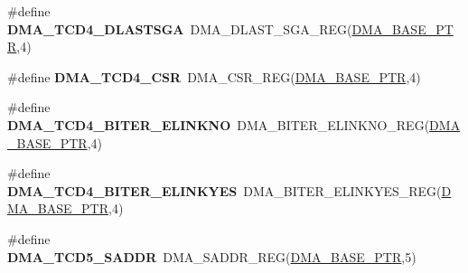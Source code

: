 \begin{DoxyCompactItemize}
\item 
\hypertarget{group___d_m_a___register___accessor___macros_ga087e361e7331f84abef82e41a3c6961f}{}\#define {\bfseries D\+M\+A\+\_\+\+T\+C\+D4\+\_\+\+D\+L\+A\+S\+T\+S\+G\+A}~D\+M\+A\+\_\+\+D\+L\+A\+S\+T\+\_\+\+S\+G\+A\+\_\+\+R\+E\+G(\hyperlink{group___d_m_a___peripheral_ga6997fbc1b1973e9f27170217a3bd6f22}{D\+M\+A\+\_\+\+B\+A\+S\+E\+\_\+\+P\+T\+R},4)\label{group___d_m_a___register___accessor___macros_ga087e361e7331f84abef82e41a3c6961f}

\item 
\hypertarget{group___d_m_a___register___accessor___macros_ga2a4c75adfdd4fccd9a457a92aab5ebb3}{}\#define {\bfseries D\+M\+A\+\_\+\+T\+C\+D4\+\_\+\+C\+S\+R}~D\+M\+A\+\_\+\+C\+S\+R\+\_\+\+R\+E\+G(\hyperlink{group___d_m_a___peripheral_ga6997fbc1b1973e9f27170217a3bd6f22}{D\+M\+A\+\_\+\+B\+A\+S\+E\+\_\+\+P\+T\+R},4)\label{group___d_m_a___register___accessor___macros_ga2a4c75adfdd4fccd9a457a92aab5ebb3}

\item 
\hypertarget{group___d_m_a___register___accessor___macros_ga026a693d34bf8ae3c371c5f4ce25e073}{}\#define {\bfseries D\+M\+A\+\_\+\+T\+C\+D4\+\_\+\+B\+I\+T\+E\+R\+\_\+\+E\+L\+I\+N\+K\+N\+O}~D\+M\+A\+\_\+\+B\+I\+T\+E\+R\+\_\+\+E\+L\+I\+N\+K\+N\+O\+\_\+\+R\+E\+G(\hyperlink{group___d_m_a___peripheral_ga6997fbc1b1973e9f27170217a3bd6f22}{D\+M\+A\+\_\+\+B\+A\+S\+E\+\_\+\+P\+T\+R},4)\label{group___d_m_a___register___accessor___macros_ga026a693d34bf8ae3c371c5f4ce25e073}

\item 
\hypertarget{group___d_m_a___register___accessor___macros_gac0e84c3dc53946dfd4bcd461b1620963}{}\#define {\bfseries D\+M\+A\+\_\+\+T\+C\+D4\+\_\+\+B\+I\+T\+E\+R\+\_\+\+E\+L\+I\+N\+K\+Y\+E\+S}~D\+M\+A\+\_\+\+B\+I\+T\+E\+R\+\_\+\+E\+L\+I\+N\+K\+Y\+E\+S\+\_\+\+R\+E\+G(\hyperlink{group___d_m_a___peripheral_ga6997fbc1b1973e9f27170217a3bd6f22}{D\+M\+A\+\_\+\+B\+A\+S\+E\+\_\+\+P\+T\+R},4)\label{group___d_m_a___register___accessor___macros_gac0e84c3dc53946dfd4bcd461b1620963}

\item 
\hypertarget{group___d_m_a___register___accessor___macros_ga32c1585febc1f3f13c83d52b7a48d57e}{}\#define {\bfseries D\+M\+A\+\_\+\+T\+C\+D5\+\_\+\+S\+A\+D\+D\+R}~D\+M\+A\+\_\+\+S\+A\+D\+D\+R\+\_\+\+R\+E\+G(\hyperlink{group___d_m_a___peripheral_ga6997fbc1b1973e9f27170217a3bd6f22}{D\+M\+A\+\_\+\+B\+A\+S\+E\+\_\+\+P\+T\+R},5)\label{group___d_m_a___register___accessor___macros_ga32c1585febc1f3f13c83d52b7a48d57e}


\end{DoxyCompactItemize}
